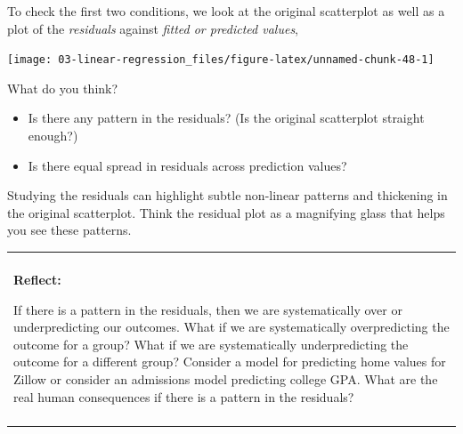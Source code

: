 \documentclass[
]{book}
\newenvironment{Shaded}{\begin{snugshade}}{\end{snugshade}}
\newcommand{\DataTypeTok}[1]{\textcolor[rgb]{0.13,0.29,0.53}{#1}}
\newcommand{\DecValTok}[1]{\textcolor[rgb]{0.00,0.00,0.81}{#1}}
\newcommand{\KeywordTok}[1]{\textcolor[rgb]{0.13,0.29,0.53}{\textbf{#1}}}
\newcommand{\NormalTok}[1]{#1}
\newcommand{\OperatorTok}[1]{\textcolor[rgb]{0.81,0.36,0.00}{\textbf{#1}}}
\newcommand{\OtherTok}[1]{\textcolor[rgb]{0.56,0.35,0.01}{#1}}
\newcommand{\StringTok}[1]{\textcolor[rgb]{0.31,0.60,0.02}{#1}}
\providecommand{\tightlist}{%
  \setlength{\itemsep}{0pt}\setlength{\parskip}{0pt}}
\newenvironment{reflect}
{
    \begin{center}
    
    \begin{tabular}{|p{0.8\textwidth}|}
    \rowcolor{LightBlue}
    \hline\\
    \rowcolor{LightBlue}
    \textbf{Reflect:}
}
{
    \\\rowcolor{LightBlue}
    \\\hline
    \end{tabular} 
    \end{center}
}
\begin{document}
To check the first two conditions, we look at the original scatterplot as well as a plot of the \emph{residuals} against \emph{fitted or predicted values},

\begin{Shaded}
\end{Shaded}

\begin{center}\texttt{[image: 03-linear-regression\_files/figure-latex/unnamed-chunk-48-1]} \end{center}

What do you think?

\begin{itemize}
\tightlist
\item
  Is there any pattern in the residuals? (Is the original scatterplot straight enough?)
\item
  Is there equal spread in residuals across prediction values?
\end{itemize}

Studying the residuals can highlight subtle non-linear patterns and thickening in the original scatterplot. Think the residual plot as a magnifying glass that helps you see these patterns.

\begin{reflect}
If there is a pattern in the residuals, then we are systematically over
or underpredicting our outcomes. What if we are systematically
overpredicting the outcome for a group? What if we are systematically
underpredicting the outcome for a different group? Consider a model for
predicting home values for Zillow or consider an admissions model
predicting college GPA. What are the real human consequences if there is
a pattern in the residuals?
\end{reflect}
\end{document}

